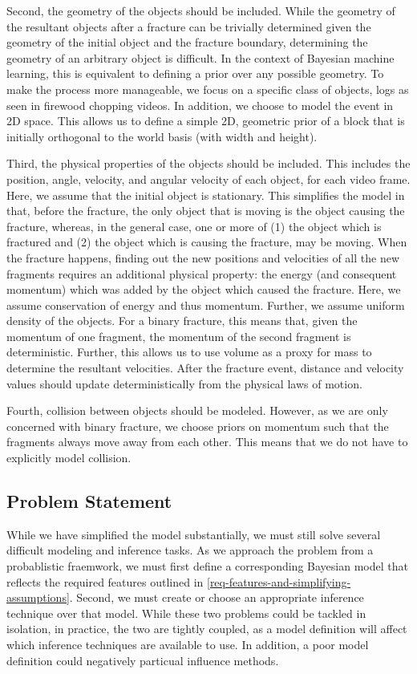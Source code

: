 \documentclass[runningheads]{llncs}
\begin{document}
Second, the geometry of the objects should be included. While the geometry of the 
resultant objects after a fracture can be trivially determined given the 
geometry of the initial object and the fracture boundary, determining the 
geometry of an arbitrary object is difficult. In the context of Bayesian machine 
learning, this is equivalent to defining a prior over any possible geometry. To 
make the process more manageable, we focus on a specific class of objects, logs 
as seen in firewood chopping videos. In addition, we choose to model the event in 2D 
space. This allows us to define a simple 2D, geometric prior of a block that is 
initially orthogonal to the world basis (with width and height).

Third, the physical properties of the objects should be included. 
This includes the position, angle, velocity, and angular velocity of each 
object, for each video frame. Here, we assume that the initial object is 
stationary. This simplifies the model in that, before the fracture, the only 
object that is moving is the object causing the fracture, whereas, in the 
general case, one or more of (1) the object which is fractured and (2) the 
object which is causing the fracture, may be moving. When the fracture happens, 
finding out the new positions and velocities of all the new fragments requires 
an additional physical property: the energy (and consequent momentum) which was 
added by the object which 
caused the fracture. Here, we assume conservation of energy and thus momentum. 
Further, we assume uniform density of the objects. 
For a binary fracture, this means that, given the momentum of one fragment, the 
momentum of the second fragment is deterministic. Further, this allows us to use 
volume as a proxy for mass to determine the resultant velocities. After the 
fracture event, distance and velocity values should update deterministically from 
the physical laws of motion.

Fourth, collision between objects should be modeled. However, as we are only 
concerned with binary fracture, we choose priors on momentum such that the 
fragments always move away from each other. This means that we do not have to 
explicitly model collision.

\subsection{Problem Statement}

While we have simplified the model substantially, we must still solve several 
difficult modeling and inference tasks. As we approach the problem from a 
probablistic fraemwork, we must first define a corresponding Bayesian model that 
reflects the required features outlined in \ref{req-features-and-simplifying-assumptions}. 
Second, we must create or choose an appropriate inference technique over that 
model. While these two problems could be tackled in isolation, in practice, the 
two are tightly coupled, as a model definition will affect which inference 
techniques are available to use. In addition, a poor model definition could 
negatively particual influence methods.
\end{document}
